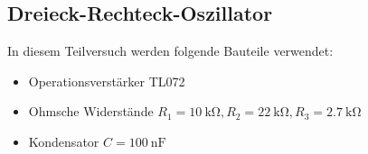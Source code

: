 
    


%

\subsection{Dreieck-Rechteck-Oszillator}

In diesem Teilversuch werden folgende Bauteile verwendet:

\begin{itemize}
    \item Operationsverstärker TL072
    \item Ohmsche Widerstände $R_1=\SI{10}{\kilo \ohm},R_2=\SI{22}{\kilo\ohm},R_3=\SI{2,7}{\kilo\ohm}$
    \item Kondensator $C=\SI{100}{\nano\farad}$
\end{itemize}

